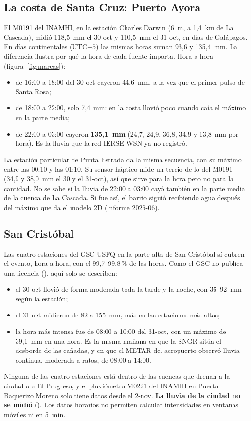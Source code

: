 \documentclass{sosg-informe}
\begin{document}
\subsection{La costa de Santa Cruz: Puerto Ayora}
El M0191 del INAMHI, en la estación Charles Darwin (6~m, a 1,4~km de La Cascada), midió 118,5~mm el 30-oct y 110,5~mm el 31-oct, en días de Galápagos. En días continentales (UTC$-5$) las mismas horas suman 93,6 y 135,4~mm. La diferencia ilustra por qué la hora de cada fuente importa. Hora a hora (figura~\ref{fig:mareas}):
\begin{itemize}
  \item de 16:00 a 18:00 del 30-oct cayeron 44,6~mm, a la vez que el primer pulso de Santa Rosa;
  \item de 18:00 a 22:00, solo 7,4~mm: en la costa llovió poco cuando caía el máximo en la parte media;
  \item de 22:00 a 03:00 cayeron \textbf{135,1~mm} (24,7, 24,9, 36,8, 34,9 y 13,8~mm por hora). Es la lluvia que la red IERSE-WSN ya no registró.
\end{itemize}
La estación particular de Punta Estrada da la misma secuencia, con su máximo entre las 00:10 y las 01:10. Su sensor háptico mide un tercio de lo del M0191 (34,9 y 38,0~mm el 30 y el 31-oct), así que sirve para la hora pero no para la cantidad. No se sabe si la lluvia de 22:00 a 03:00 cayó también en la parte media de la cuenca de La Cascada. Si fue así, el barrio siguió recibiendo agua después del máximo que da el modelo 2D (informe 2026-06).

\subsection{San Cristóbal}
Las cuatro estaciones del GSC-USFQ en la parte alta de San Cristóbal sí cubren el evento, hora a hora, con el 99,7--99,8\,\% de las horas. Como el GSC no publica una licencia (), aquí solo se describen:
\begin{itemize}
  \item el 30-oct llovió de forma moderada toda la tarde y la noche, con 36--92~mm según la estación;
  \item el 31-oct midieron de 82 a 155~mm, más en las estaciones más altas;
  \item la hora más intensa fue de 08:00 a 10:00 del 31-oct, con un máximo de 39,1~mm en una hora. Es la misma mañana en que la SNGR sitúa el desborde de las cañadas, y en que el METAR del aeropuerto observó lluvia continua, moderada a ratos, de 08:00 a 14:00.
\end{itemize}
Ninguna de las cuatro estaciones está dentro de las cuencas que drenan a la ciudad o a El Progreso, y el pluviómetro M0221 del INAMHI en Puerto Baquerizo Moreno solo tiene datos desde el 2-nov. \textbf{La lluvia de la ciudad no se midió} (). Los datos horarios no permiten calcular intensidades en ventanas móviles ni en 5~min.
\end{document}
